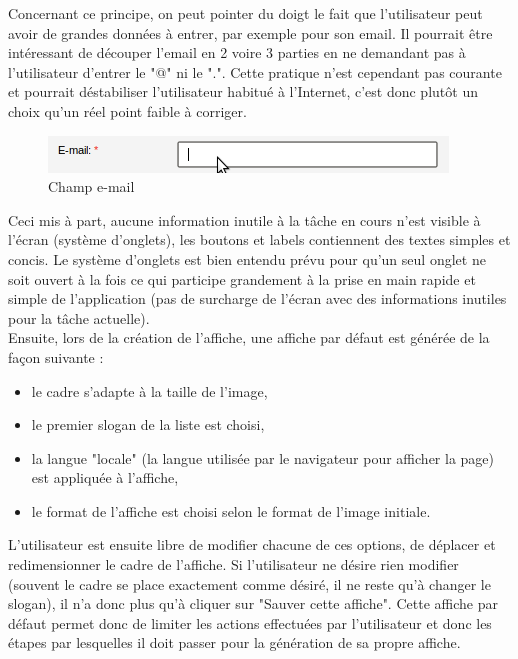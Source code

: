 \documentclass{article}
\begin{document}
\begin{sffamily}
Concernant ce principe, on peut pointer du doigt le fait que l'utilisateur peut avoir de grandes données à entrer, par exemple pour son email. Il 
pourrait être intéressant de découper l'email en 2 voire 3 parties en ne demandant pas à l'utilisateur d'entrer le "@" ni le ".". Cette pratique 
n'est cependant pas courante et pourrait déstabiliser l'utilisateur habitué à l'Internet, c'est donc plutôt un choix qu'un réel point faible à 
corriger.

\begin{figure}[h!]
	\begin{center}
		\includegraphics[scale=0.3]{ergo_009.png}
		\caption{Champ e-mail}
	\end{center}
\end{figure}

Ceci mis à part, aucune information inutile à la tâche en cours n'est visible à l'écran (système d'onglets), les boutons et labels contiennent des 
textes simples et concis. Le système d'onglets est bien entendu prévu pour qu'un seul onglet ne soit ouvert à la fois ce qui participe grandement à 
la prise en main rapide et simple de l'application (pas de surcharge de l'écran avec des informations inutiles pour la tâche actuelle). \\

Ensuite, lors de la création de l'affiche, une affiche par défaut est générée de la façon suivante :
\begin{itemize}
\item le cadre s'adapte à la taille de l'image,
\item le premier slogan de la liste est choisi,
\item la langue "locale" (la langue utilisée par le navigateur pour afficher la page) est appliquée à l'affiche,
\item le format de l'affiche est choisi selon le format de l'image initiale.
\end{itemize}
L'utilisateur est ensuite libre de modifier chacune de ces options, de déplacer et redimensionner le cadre de l'affiche. Si l'utilisateur ne désire 
rien modifier (souvent le cadre se place exactement comme désiré, il ne reste qu'à changer le slogan), il n'a donc plus qu'à cliquer sur "Sauver 
cette affiche". Cette affiche par défaut permet donc de limiter les actions effectuées par l'utilisateur et donc les étapes par lesquelles il doit 
passer pour la génération de sa propre affiche.\\


\end{sffamily}
\end{document}
